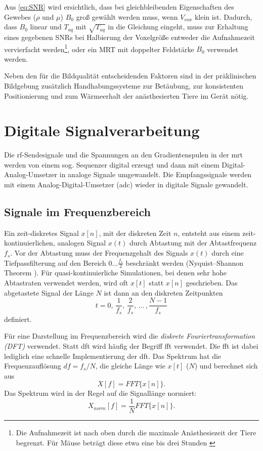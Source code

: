 Aus \autoref{eq:SNR} wird ersichtlich, dass bei gleichbleibenden Eigenschaften des Gewebes ($\rho$ und $\mu$) $B_0$ groß gewählt werden muss, wenn $V_{vox}$ klein ist.
Dadurch, dass $B_0$ linear und $T_{aq}$ mit $\sqrt{T_{aq}}$ in die Gleichung eingeht, muss zur Erhaltung eines gegebenen SNRs bei Halbierung der Voxelgröße entweder die Aufnahmezeit vervierfacht werden\footnote{Die Aufnahmezeit ist nach oben durch die maximale Anästhesiezeit der Tiere begrenzt. Für Mäuse beträgt diese etwa eine bis drei Stunden \cite{Kiessling2017}}, oder ein MRT mit doppelter Feldstärke $B_0$ verwendet werden.

Neben den für die Bildqualität entscheidenden Faktoren sind in der präklinischen Bildgebung zusätzlich Handhabungssysteme zur Betäubung, zur konsistenten Positionierung und zum Wärmeerhalt der anästhesierten Tiere im Gerät nötig.


\section{Digitale Signalverarbeitung}
Die \gls{rf}-Sendesignale und die Spannungen an den Gradientenspulen in der \gls{mrt} werden von einem sog. Sequenzer digital erzeugt und dann mit einem Digital-Analog-Umsetzer in analoge Signale umgewandelt. Die Empfangssignale werden mit einem Analog-Digital-Umsetzer (\gls{adc}) wieder in digitale Signale gewandelt.

\subsection{Signale im Frequenzbereich}
Ein zeit-diskretes Signal $x[n]$, mit der diskreten Zeit $n$, entsteht aus einem zeit-kontinuierlichen, analogen Signal $x(t)$ durch Abtastung mit der Abtastfrequenz $f_s$. Vor der Abtastung muss der Frequenzgehalt des Signals $x(t)$ durch eine Tiefpassfilterung auf den Bereich $0 \dots \frac{f_s}{2}$ beschränkt werden (Nyquist–Shannon Theorem \cite{Shannon1949}).
Für quasi-kontinuierliche Simulationen, bei denen sehr hohe Abtastraten verwendet werden, wird oft $x[t]$ statt $x[n]$ geschrieben. Das abgetastete Signal der Länge $N$ ist dann an den diskreten Zeitpunkten
\begin{equation}
	t=0,\,\frac{1}{f_s},\,\frac{2}{f_s},\, \dots \,,\frac{N-1}{f_s}
\end{equation}
definiert.

Für eine Darstellung im Frequenzbereich wird die \textit{diskrete Fouriertransformation (DFT)} verwendet. Statt \gls{dft} wird häufig der Begriff \gls{fft} verwendet. Die \gls{fft} ist dabei lediglich eine schnelle Implementierung der \gls{dft}.
Das Spektrum hat die Frequenzauflösung $df=f_s/N$, die gleiche Länge wie $x[t]$ ($N$) und berechnet sich aus 
\begin{equation}
	X[f]=FFT\{x[n]\}.
\end{equation}
Das Spektrum wird in der Regel auf die Signallänge normiert:
\begin{equation}
X_{norm}[f]=\frac{1}{N} FFT\{x[n]\}.
\end{equation}

